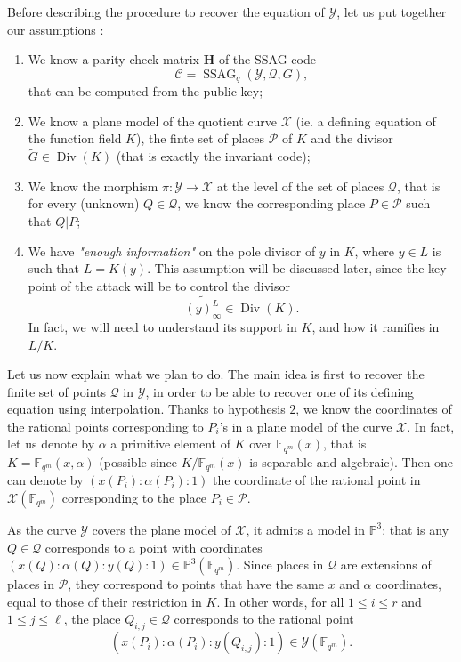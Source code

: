 \documentclass[10pt]{article}
\theoremstyle{definition}
\theoremstyle{definition}
\theoremstyle{definition}
\newcommand{\s}{\vspace{0.3cm}}
\newcommand{\PP}{\mathbb{P}}
\newcommand{\fqm}{\mathbb{F}_{q^m}}
\newcommand{\X}{\mathcal{X}}
\newcommand{\Y}{\mathcal{Y}}
\newcommand{\PR}{\mathcal{P}}
\newcommand{\QR}{\mathcal{Q}}
\newcommand{\Div}{\operatorname{Div}}
\newcommand{\ssag}{\operatorname{SSAG}}
\newcommand{\hugues}[1]{\textcolor{blue}{#1}}
\newcommand{\notehugues}[1]{\marginpar{\small\hugues{#1}}}
\begin{document}
\s

Before describing the procedure to recover the equation of $\Y$, let us put together our assumptions :

\begin{enumerate}
\item We know a parity check matrix $\mathbf{H}$ of the SSAG-code  \[\mathcal{C} = \ssag_q(\Y,\QR,G),\]
that can be computed from the public key;
\item We know a plane model of the quotient curve $\X$ (ie. a defining equation of the function field $K$), the finte set of places $\PR$ of $K$ and the divisor $\tilde{G} \in \Div(K)$ (that is exactly the invariant code);
\item We know the morphism $\pi : \Y \longrightarrow \X$ at the level of the set of places $\QR$, that is for every (unknown) $Q \in \QR$, we know the corresponding place $P \in \PR$ such that $Q|P$;
\item We have \emph{"enough information"} on the pole divisor of $y$ in $K$, where $y \in L$ is such that $L=K(y)$. This assumption will be discussed later, since the key point of the attack will be to control the divisor 
\[\widetilde{(y)^L_{\infty}} \in \Div(K).\] 
In fact, we will need to understand its support in $K$, and how it ramifies in $L/K$.
\end{enumerate}
\s
Let us now explain what we plan to do. The main idea is first to recover the finite set of points $\QR$ in $\Y$, in order to be able to recover \color{purple} one of its \color{black} defining equation using interpolation. Thanks to hypothesis $2$, we know the coordinates of the rational points corresponding to $P_i$'s in a plane model of the curve $\X$. In fact, let us denote by $\alpha$ a primitive element of $K$ over $\fqm(x)$, that is $K = \fqm(x,\alpha)$ (possible since $K/\fqm(x)$ is separable and algebraic). Then one can denote by $(x(P_i):\alpha(P_i):1)$ the coordinate of the rational point in $\X(\fqm)$ corresponding to the place $P_i \in \PR$. 

As the curve $\Y$ covers the plane model of $\X$, it admits a model in $\PP^3$; that is any $Q \in \QR$ corresponds to a point with coordinates $(x(Q):\alpha(Q):y(Q):1) \in \PP^3(\fqm)$. Since places in $\QR$ are extensions of places in $\PR$, they correspond to points that have the same $x$ and $\alpha$ coordinates, equal to those of their restriction in $K$. In other words, for all $1 \leq i \leq r$ and $1 \leq j \leq \ell$, the place $Q_{i,j} \in \QR$ corresponds to the rational point
\[ (x(P_i):\alpha(P_i):y(Q_{i,j}):1) \in \Y(\fqm).\]
\end{document}
